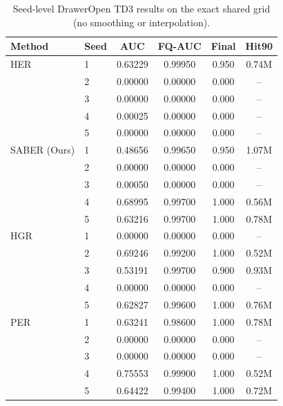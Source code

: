 \begin{table}[t]
\centering
\small
\setlength{\tabcolsep}{1pt}
\begin{tabular}{llcccc}
\toprule
Method & Seed & AUC & FQ-AUC & Final & Hit90 \\
\midrule
HER & 1 & 0.63229 & 0.99950 & 0.950 & 0.74M \\
 & 2 & 0.00000 & 0.00000 & 0.000 & -- \\
 & 3 & 0.00000 & 0.00000 & 0.000 & -- \\
 & 4 & 0.00025 & 0.00000 & 0.000 & -- \\
 & 5 & 0.00000 & 0.00000 & 0.000 & -- \\
\addlinespace[1pt]
SABER (Ours) & 1 & 0.48656 & 0.99650 & 0.950 & 1.07M \\
 & 2 & 0.00000 & 0.00000 & 0.000 & -- \\
 & 3 & 0.00050 & 0.00000 & 0.000 & -- \\
 & 4 & 0.68995 & 0.99700 & 1.000 & 0.56M \\
 & 5 & 0.63216 & 0.99700 & 1.000 & 0.78M \\
\addlinespace[1pt]
HGR & 1 & 0.00000 & 0.00000 & 0.000 & -- \\
 & 2 & 0.69246 & 0.99200 & 1.000 & 0.52M \\
 & 3 & 0.53191 & 0.99700 & 0.900 & 0.93M \\
 & 4 & 0.00000 & 0.00000 & 0.000 & -- \\
 & 5 & 0.62827 & 0.99600 & 1.000 & 0.76M \\
\addlinespace[1pt]
PER & 1 & 0.63241 & 0.98600 & 1.000 & 0.78M \\
 & 2 & 0.00000 & 0.00000 & 0.000 & -- \\
 & 3 & 0.00000 & 0.00000 & 0.000 & -- \\
 & 4 & 0.75553 & 0.99900 & 1.000 & 0.52M \\
 & 5 & 0.64422 & 0.99400 & 1.000 & 0.72M \\
\bottomrule
\end{tabular}
\caption{Seed-level DrawerOpen TD3 results on the exact shared grid (no smoothing or interpolation).}
\label{tab:supp-seeds-drawer-open-td3}
\end{table}
